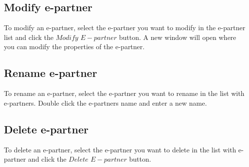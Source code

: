 \documentclass[a4paper]{article}
\begin{document}
\subsection{Modify e-partner}
To modify an e-partner, select the e-partner you want to modify in the e-partner list and click the $Modify$ $E-partner$ button. A new window will open where you can modify the properties of the e-partner.

\subsection{Rename e-partner}
To rename an e-partner, select the e-partner you want to rename in the list with e-partners. Double click the e-partners name and enter a new name. %

\subsection{Delete e-partner}
To delete an e-partner, select the e-partner you want to delete in the list with e-partner and click the $Delete$ $E-partner$ button.
\end{document}
